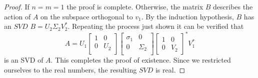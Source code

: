 \documentclass{article}
\begin{document}
\begin{proof}
If $n=m=1$ the proof is complete. Otherwise, the matrix $B$ describes the action of $A$ on the subspace orthogonal to $v_1$. By the induction hypothesis, $B$ has an $SVD$ $B=U_2\Sigma_2 V_2^*$. Repeating the process just shown it can be verified that
\[
    A = U_1 \begin{bmatrix}
        1 & 0\\
        0 & U_2\\
    \end{bmatrix}
    \begin{bmatrix}
        \sigma_1 & 0\\
        0 & \Sigma_2\\
    \end{bmatrix}    
    \begin{bmatrix}
        1 & 0\\
        0 & V_2
    \end{bmatrix}^*
    V_1^*
\] is an SVD of $A$. This completes the proof of existence. Since we restricted ourselves to the real numbers, the resulting $SVD$ is real.

\end{proof}
\end{document}
